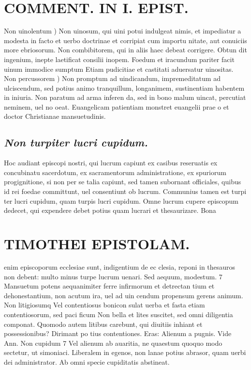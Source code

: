 \documentclass{article}
\begin{document}
\begin{pages}
\section*{COMMENT. IN I. EPIST. }
\marginpar{[ p.76 ]}\pstart Non uinolentum ) Non uinosum, qui uini potui indulgeat nimis, et impediatur a modesta in facto et uerbo doctrinae et corripiat cum importu nitate, aut conuiciis more ebriosorum. Non combibitorem, qui in aliis haec debeat corrigere. Obtun dit ingenium, inepte laetificat consilii inopem. Foedum et iracundum pariter facit uinum immodice sumptum Etiam pudicitiae et castitati aduersatur uinositas.  \pend\pstart Non percussorem ) Non promptum ad uindicandum, impremeditatum ad ulciscendum, sed potius animo tranquillum, longanimem, sustinentiam habentem in iniuria. Non paratum ad arma inferen da, sed in bono malum uincat, percutiat neminem, uel no oeat. Euangelicam patientiam monstret euangelii prae o et doctor Christianae mansuetudinis.  \pend
{}
{}
\subsection*{\textit{Non turpiter lucri cupidum. }}\pstart Hoc audiant episcopi nostri, qui lucrum capiunt ex casibus reseruatis ex concubinatu sacerdotum, ex sacramentorum administratione, ex spuriorum progignitione, si non per se talia capiunt, sed tamen subornant officiales, quibus id rei foedae committunt, uel consentiunt ob lucrum. Communius tamen est turpi ter lucri cupidum, quam turpis lucri cupidum. Omne lucrum cupere episcopum dedecet, qui expendere debet potius quam lucrari et thesaurizare. Bona  \pend
\section*{TIMOTHEI EPISTOLAM. }
\marginpar{[ p.77 ]}\pstart enim episcoporum ecclesiae sunt, indigentium de ec clesia, reponi in thesauros non debent: multo minus turpe lucrum uenari.  \pend\pstart Sed aequum, modestum. 7 Mansuetum potens aequanimiter ferre infirmorum et detrectan tium et dehonestantium, non acutum ira, uel ad uin cendum propensum gerens animum.  \pend\pstart Non litigiosumq Vel contentiosus bonicon sulat uerba et fasta etiam contentiosorum, sed paci ficum Non bella et lites suscitet, sed omni diligentia componat. Quomodo autem litibus carebunt, qui diuitiis inhiant et possessionibus? Dirimant po tius contentiones. Eras: Alienum a pugnis. Vide Ann. Non cupidum 7 Vel alienum ab auaritia, ne quaestum quoquo modo sectetur, ut simoniaci. Liberalem in egenos, non lanae potius abrasor, quam uerbi dei administrator. Ab omni specie cupiditatis abstineat.  \pend
{}
{}

\end{pages}
\end{document}
